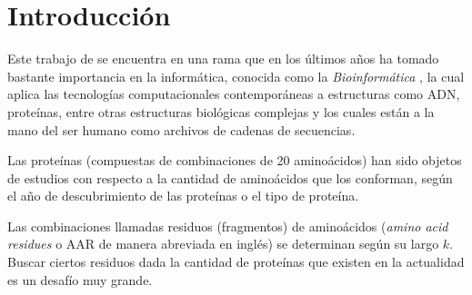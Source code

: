 \chapter*{Introducci\'on}

Este trabajo de se encuentra en una rama que en los últimos años ha tomado bastante importancia en la informática, conocida como la {\textit{Bioinformática}} \cite{bioinformatica}, la cual aplica las tecnologías computacionales contemporáneas a estructuras como ADN, proteínas, entre otras estructuras biológicas complejas y los cuales están a la mano del ser humano como archivos de cadenas de secuencias.

Las proteínas (compuestas de combinaciones de 20 aminoácidos) han sido objetos de estudios \cite{searching, array} con respecto a la cantidad de aminoácidos que los conforman, según el año de descubrimiento de las proteínas o el tipo de proteína.

Las combinaciones llamadas residuos (fragmentos) de aminoácidos ({\textit{amino acid residues}} o AAR de manera abreviada en inglés) se determinan según su largo $k$. Buscar ciertos residuos dada la cantidad de proteínas que existen en la actualidad es un desafío muy grande.